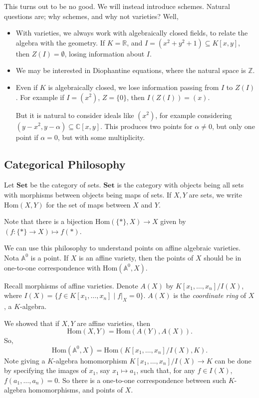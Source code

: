 \documentclass[12pt]{article}
\begin{document}
This turns out to be no good. We will instead introduce schemes. Natural questions are; why schemes, and why not varieties? Well,
\begin{itemize}
	\item With varieties, we always work with algebraically closed fields, to relate the algebra with the geometry. If $K = \mathbb{R}$, and $I = (x^2 + y^2 + 1) \subseteq K[x, y]$, then $Z(I) = \emptyset$, losing information about $I$.
	\item We may be interested in Diophantine equations, where the natural space is $\mathbb{Z}$.
	\item Even if $K$ is algebraically closed, we lose information passing from $I$ to $Z(I)$. For example if $I = (x^2)$, $Z = \{0\}$, then $I(Z(I)) = (x)$.

		But it is natural to consider ideals like $(x^2)$, for example considering $(y-x^2, y - \alpha) \subseteq \mathbb{C}[x, y]$. This produces two points for $\alpha \neq 0$, but only one point if $\alpha = 0$, but with some multiplicity.
\end{itemize}

\subsection{Categorical Philosophy}%
\label{sub:cat_phil}

Let $\mathbf{Set}$ be the category of sets. $\mathbf{Set}$ is the category with objects being all sets with morphisms between objects being maps of sets. If $X, Y$ are sets, we write $\mathrm{Hom}(X, Y)$ for the set of maps between $X$ and $Y$.

Note that there is a bijection $\mathrm{Hom}(\{\ast\}, X) \to X$ given by $(f : \{\ast\} \to X) \mapsto f(\ast)$.

We can use this philosophy to understand points on affine algebraic varieties. Nota $\mathbb{A}^0$ is a point. If $X$ is an affine variety, then the points of $X$ should be in one-to-one correspondence with $\mathrm{Hom}(\mathbb{A}^0, X)$.

Recall morphisms of affine varieties. Denote $A(X)$ by $K[x_1, \ldots, x_n]/I(X)$, where $I(X) = \{f \in K[x_1, \ldots, x_n] \mid f|_X = 0\}$. $A(X)$ is the \emph{coordinate ring} of $X$, a $K$-algebra.

We showed that if $X, Y$ are affine varieties, then
\[
\mathrm{Hom}(X, Y) = \mathrm{Hom}(A(Y), A(X)).
\]
So,
\[
	\mathrm{Hom}(\mathbb{A}^0, X) = \mathrm{Hom}(K[x_1, \ldots, x_n]/I(X), K).
\]
Note giving a $K$-algebra homomorphism $K[x_1, \ldots, x_n]/I(X) \to K$ can be done by specifying the images of $x_1$, say $x_1 \mapsto a_1$, such that, for any $f \in I(X)$, $f(a_1, \ldots, a_n) = 0$. So there is a one-to-one correspondence between such $K$-algebra homomorphisms, and points of $X$.
\end{document}
